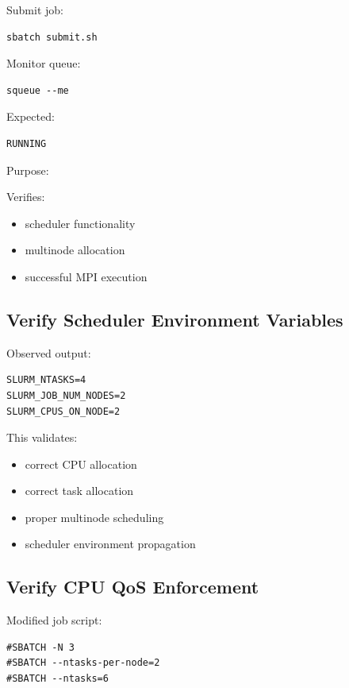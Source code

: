\documentclass[11pt]{article}
\begin{document}
Submit job:

\begin{verbatim}
sbatch submit.sh
\end{verbatim}

Monitor queue:

\begin{verbatim}
squeue --me
\end{verbatim}

Expected:

\begin{verbatim}
RUNNING
\end{verbatim}

Purpose:

Verifies:

\begin{itemize}
\item scheduler functionality
\item multinode allocation
\item successful MPI execution
\end{itemize}
\subsection{Verify Scheduler Environment Variables}
\label{sec:org4422860}

Observed output:

\begin{verbatim}
SLURM_NTASKS=4
SLURM_JOB_NUM_NODES=2
SLURM_CPUS_ON_NODE=2
\end{verbatim}

This validates:

\begin{itemize}
\item correct CPU allocation
\item correct task allocation
\item proper multinode scheduling
\item scheduler environment propagation
\end{itemize}
\subsection{Verify CPU QoS Enforcement}
\label{sec:org9a8d28c}

Modified job script:

\begin{verbatim}
#SBATCH -N 3
#SBATCH --ntasks-per-node=2
#SBATCH --ntasks=6
\end{verbatim}
\end{document}
